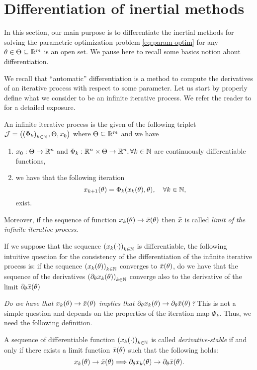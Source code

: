 \section{Differentiation of  inertial methods }\label{sec:ad-ima}
In this section, our main purpose is to differentiate the inertial methods for solving the parametric optimization problem \eqref{eq:param-optim} for any $\theta\in\Theta\subseteq\mathbb{R}^m$ is an open set. We pause here to recall some basics notion about differentiation. 

We recall that ``automatic'' differentiation is a method to compute the derivatives of an iterative process with respect to some parameter. Let us start by properly define what we consider to be an infinite iterative process. We refer the reader to \cite[Section~2]{beck1994} for a detailed exposure. 
\begin{definition}\label{def:codelist}An infinite iterative process is the given of the following triplet  $\mathcal{J}=\left({\left(\Phi_k\right)_{k\in\mathbb{N}},\Theta,x_{0}}\right)$ where $\Theta\subseteq\mathbb{R}^m$ and 
we have 
\begin{enumerate}
\item $x_{0}:\Theta\to\mathbb{R}^n$  and $\Phi_k:\mathbb{R}^{n}\times\Theta\to\mathbb{R}^n,\forall k\in\mathbb{N}$ are continuously differentiable functions,
\item we have that the following iteration 
	\begin{equation}\label{eq:code-list} 
			x_{k+1}(\theta)=\Phi_k(x_{k}(\theta),\theta),\quad \forall k\in\mathbb{N},
	\end{equation}
	exist. 
\end{enumerate}
Moreover, if the sequence of function $x_{k}(\theta) \to \bar{x}(\theta)$ then $\bar{x}$ is called \textit{limit of the infinite iterative process}.
\end{definition} 
If we suppose that the sequence $\left(x_{k}(\cdot)\right)_{k\in\mathbb{N}}$ is differentiable, the following intuitive question  for the consistency of the differentiation of  the infinite iterative process is: if the sequence $\left(x_{k}(\theta)\right)_{k\in\mathbb{N}}$  converges to $\bar{x}(\theta)$, do we have that the sequence of the derivatives $\left(\partial_{\theta}x_{k}(\theta)\right)_{k\in\mathbb{N}}$ converge also  to the derivative of the limit $\partial_{\theta}\bar{x}(\theta)$ \ie

\textit{Do we have that  $x_{k}(\theta) \to \bar{x}(\theta)$ implies that $\partial_{\theta}x_{k}(\theta) \to \partial_{\theta}\bar{x}(\theta)$?}  This is not a simple question and depends on the properties of the iteration map $\Phi_k$. Thus, we need the following definition.
\begin{definition}\label{def:der-sta} 
A sequence of differentiable function $\left(x_{k}(\cdot)\right)_{k\in\mathbb{N}}$ is called \textit{derivative-stable} if and only if there exists a limit function $\bar{x}(\theta)$ such that the following holds:
\begin{equation}\label{eq:der-sta}
x_{k}(\theta) \to \bar{x}(\theta) \Longrightarrow \partial_{\theta}x_{k}(\theta) \to \partial_{\theta}\bar{x}(\theta).
\end{equation}
\end{definition}

